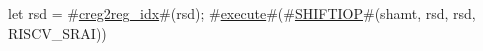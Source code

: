 let rsd = #\hyperref[sailRISCVzcreg2regzyidx]{creg2reg\_idx}#(rsd);
#\hyperref[sailRISCVzexecute]{execute}#(#\hyperref[sailRISCVzSHIFTIOP]{SHIFTIOP}#(shamt, rsd, rsd, RISCV_SRAI))
